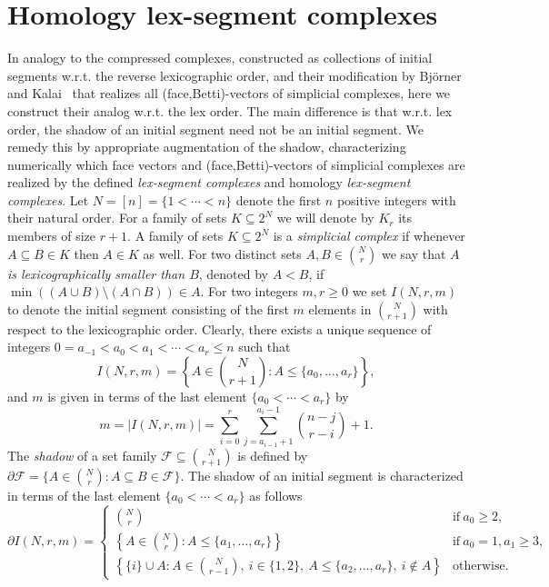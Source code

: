 \section{Homology lex-segment complexes}\label{apx:lex}
In analogy to the compressed complexes, constructed as collections of initial segments w.r.t. the reverse lexicographic order, and their modification by Bj\"{o}rner and Kalai~\cite{Bjorner-Kalai-ACTA} that realizes all (face,Betti)-vectors of simplicial complexes, here we construct their analog w.r.t. the lex order. The main difference is that w.r.t. lex order, the shadow of an initial segment need not be an initial segment. We remedy this by appropriate augmentation of the shadow, characterizing numerically which face vectors and (face,Betti)-vectors of simplicial complexes are realized  
by the defined \emph{lex-segment complexes} and homology \emph{lex-segment complexes}.
%
%
Let $N=[n]=\{1 < \cdots < n\}$ denote the first $n$ positive integers with their natural order.
For a family of sets $K \subseteq 2^N$ we will denote by $K_r$ its members of size $r+1$.
A family of sets $K \subseteq 2^N$ is a \emph{simplicial complex} if whenever $A\subseteq B\in K$ then $A\in K$ as well.
%
For two distinct sets $A,B\in \binom{N}{r}$ we say that \emph{$A$ is lexicographically smaller than $B$}, denoted by $A<B$, if $\min ((A\cup B)\setminus (A\cap B)) \in A$.
For two integers $m,r\geq 0$ we set $I(N,r,m)$ to denote the initial segment consisting of the first $m$ elements in $\binom{N}{r+1}$ with respect to the lexicographic order. 
Clearly, there exists a unique sequence of integers $0=a_{-1}<a_0< a_1< \cdots < a_r\leq n$ such that $$I(N,r,m) = \left \{A \in \binom{N}{r+1} \colon A \leq \{a_0,\dots,a_r \} \right \},$$
%
and $m$
is given in terms of the last element $\{a_0<\cdots<a_r\}$ by $$m=|I(N,r,m)| = \sum_{i=0}^r \sum_{j=a_{i-1}+1}^{a_i-1} \binom{n-j}{r-i} + 1.$$
%
The \emph{shadow} of a set family $\mathcal{F} \subseteq \binom{N}{r+1}$ is defined by $\partial \mathcal{F} = \{A\in \binom{N}{r} \colon A\subseteq B \in \mathcal{F}\}$.
The shadow of an initial segment is characterized in terms of the last element $\{a_0<\cdots <a_r\}$ as follows
$$\partial I(N,r,m) = 
\begin{cases} 
    \binom{N}{r} & \text{if}~a_0\geq 2, \\
    \left \{A \in \binom{N}{r} \colon A \leq \{a_1,\dots, a_r\} \right \} & \text{if}~a_0=1, a_1\geq 3,\\
    \left \{ \{i\} \cup A \colon A \in \binom{N}{r-1},~i\in \{1,2\},~A\leq \{a_2,\dots, a_r\},~i\notin A  \right \} & \text{otherwise.}
\end{cases}$$

